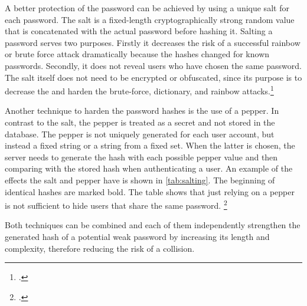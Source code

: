 A better protection of the password can be achieved by using a unique \frqq salt\flqq{} for each password. The salt is a fixed-length cryptographically strong random value that is concatenated with the actual password before hashing it. Salting a password serves two purposes. Firstly it decreases the risk of a successful rainbow or brute force attack dramatically because the hashes changed for known passwords. Secondly, it does not reveal users who have chosen the same password. The salt itself does not need to be encrypted or obfuscated, since its purpose is to decrease the and harden the brute-force, dictionary, and rainbow attacks.\footcites[See][32--34]{IdentityandDataSecurityforWebDevelopment}[See][130--131]{brotherston2017defensive}[See][15]{SP80063B}

Another technique to harden the password hashes is the use of a \frqq pepper\flqq{}. In contrast to the salt, the pepper is treated as a secret and not stored in the database. The pepper is not uniquely generated for each user account, but instead a fixed string or a string from a fixed set. When the latter is chosen, the server needs to generate the hash with each possible pepper value and then comparing with the stored hash when authenticating a user. An example of the effects the salt and pepper have is shown in \autoref{tab:salting}. The beginning of identical hashes are marked bold. The table shows that just relying on a pepper is not sufficient to hide users that share the same password. \footcites[See][33--35]{IdentityandDataSecurityforWebDevelopment}[See][15]{SP80063B}[See][173]{MANBER1996171}

Both techniques can be combined and each of them independently strengthen the generated hash of a potential weak password by increasing its length and complexity, therefore reducing the risk of a collision.

